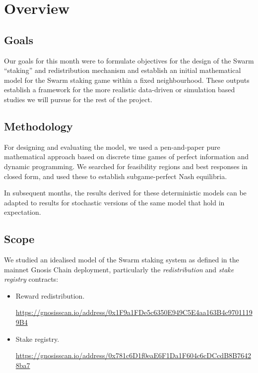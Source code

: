 \maketitle
\section*{Overview}

\subsection*{Goals}

Our goals for this month were to formulate objectives for the design of the Swarm ``staking'' and redistribution mechanism and establish an initial mathematical model for the Swarm staking game within a fixed neighbourhood. 
%
These outputs establish a framework for the more realistic data-driven or simulation based studies we will pursue for the rest of the project.

\subsection*{Methodology}

For designing and evaluating the model, we used a pen-and-paper pure mathematical approach based on discrete time games of perfect information and dynamic programming.
%
We searched for feasibility regions and best responses in closed form, and used these to establish subgame-perfect Nash equilibria.

In subsequent months, the results derived for these deterministic models can be adapted to results for stochastic versions of the same model that hold in expectation.

\subsection*{Scope}

We studied an idealised model of the Swarm staking system as defined in the mainnet Gnosis Chain deployment, particularly the \emph{redistribution} and \emph{stake registry} contracts:

\begin{itemize}
\item Reward redistribution. 

{\small\url{https://gnosisscan.io/address/0x1F9a1FDe5c6350E949C5E4aa163B4c97011199B4}}
\item Stake registry. 

{\small\url{https://gnosisscan.io/address/0x781c6D1f0eaE6F1Da1F604c6cDCcdB8B76428ba7}}
\end{itemize}

